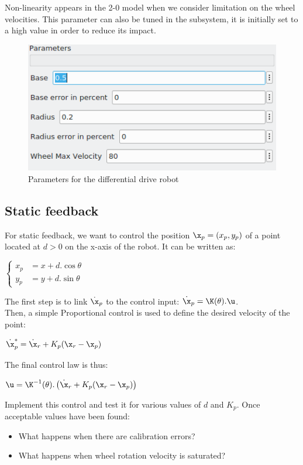 \documentclass{ecnreport}
\begin{document}
Non-linearity appears in the 2-0 model when we consider limitation on the wheel velocities. This parameter can also be tuned in the subsystem, it is initially set to a high value in order to reduce its impact.

\begin{figure}[ht]
\centering
\includegraphics[width=0.4\linewidth]{param20}
\caption{Parameters for the differential drive robot}
\end{figure}

\subsection{Static feedback}

For static feedback, we want to control the position $\x_p = (x_p,y_p)$ of a point located at $d > 0$ on the x-axis of the robot.
It can be written as: 
\begin{center}
 $\left\{\begin{array}{ll}
         x_p &= x + d.\cos\theta \\
         y_p &= y + d.\sin\theta 
        \end{array}\right.$
\end{center}
The first step is to link $\dot \x_p$ to the control input: $\dot \x_p = \K(\theta).\u$.
\\

Then, a simple Proportional control is used to define the desired velocity of the point:
\begin{center}
$\dot \x_p^* = \dot \x_r + K_p(\x_r - \x_p)$
\end{center}
The final control law is thus:
\begin{center}
$\u = \K^{-1}(\theta) .\left(\dot \x_r + K_p(\x_r - \x_p)\right)$
\end{center}

Implement this control and test it for various values of $d$ and $K_p$. Once acceptable values have been found:
\begin{itemize}
 \item What happens when there are calibration errors?
 \item What happens when wheel rotation velocity is saturated?
\end{itemize} 
\end{document}
